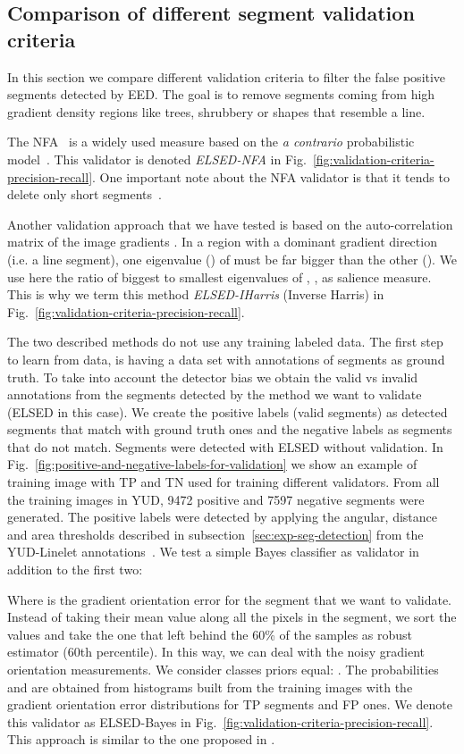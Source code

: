 \documentclass[preprint,12pt]{elsarticle}
\begin{document}
\subsection{Comparison of different segment validation criteria}
\label{sec:experiment-validation}

In this section we compare different validation criteria to filter the false positive segments detected by EED. The goal is to remove segments coming from high gradient density regions like trees, shrubbery or shapes that resemble a line.

The NFA~\cite{grompone2010lsd} is a widely used measure based on the \textit{a contrario} probabilistic model~\cite{desolneux2000meaningful}. 
This validator is denoted \emph{ELSED-NFA} in Fig.~\ref{fig:validation-criteria-precision-recall}. One important note about the NFA validator is that it tends to delete only short segments~\cite{akinlar2011edlines}.

Another validation approach that we have tested is based on the auto-correlation matrix of the image gradients . In a region with a dominant gradient direction (i.e. a line segment), one eigenvalue () of  must be far bigger than the other (). 
We use here the ratio of biggest to smallest eigenvalues of , , as salience measure. This is why we term this method \emph{ELSED-IHarris} (Inverse Harris) in Fig.~\ref{fig:validation-criteria-precision-recall}.

The two described methods do not use any training labeled data. 
The first step to learn from data, is having a data set with annotations of segments as ground truth. To take into account the detector bias we obtain the valid vs invalid annotations from the segments detected by the method we want to validate (ELSED in this case). We create the positive labels (valid segments) as detected segments that match with ground truth ones and the negative labels as segments that do not match. Segments were detected with ELSED without validation. 
In Fig.~\ref{fig:positive-and-negative-labels-for-validation} we show an example of training image with TP and TN used for training different validators. 
From all the training images in YUD, 9472 positive and 7597 negative segments were generated. The positive labels were detected by applying the angular, distance and area thresholds described in subsection~\ref{sec:exp-seg-detection} from the YUD-Linelet annotations~\cite{cho2017novel}. 
We test a simple Bayes classifier as validator in addition to the first two:

Where  is the gradient orientation error for the segment that we want to validate. Instead of taking their mean value along all the pixels in the segment, we sort the values and take the one that left behind the 60\% of the samples as robust estimator (60th percentile).
In this way, we can deal with the noisy gradient orientation measurements. We consider classes priors equal: .
The probabilities  and  are obtained from histograms built from the training images with the gradient orientation error distributions for TP segments and FP ones. We denote this validator as ELSED-Bayes in Fig.~\ref{fig:validation-criteria-precision-recall}. This approach is similar to the one proposed in \cite{almazan2017mcmlsd}.
\end{document}
